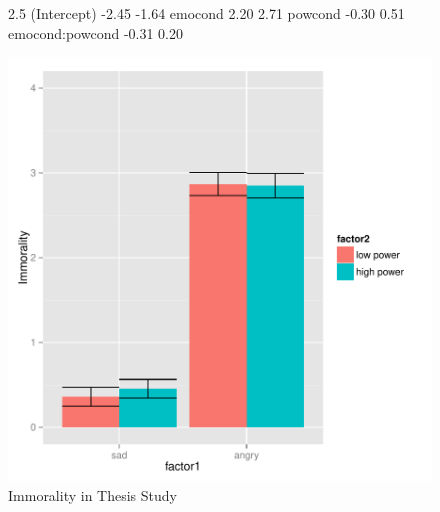 \documentclass[man,apacite,floatsintext]{apa6}
\begin{document}
\begin{figure}
\begin{Schunk}
\begin{Soutput}
                2.5 %
(Intercept)     -2.45  -1.64
emocond          2.20   2.71
powcond         -0.30   0.51
emocond:powcond -0.31   0.20
\end{Soutput}
\end{Schunk}
\includegraphics{PowerResults-ThesisImmoral}
\caption{Immorality in Thesis Study}
\end{figure}
\newpage
\end{document}
